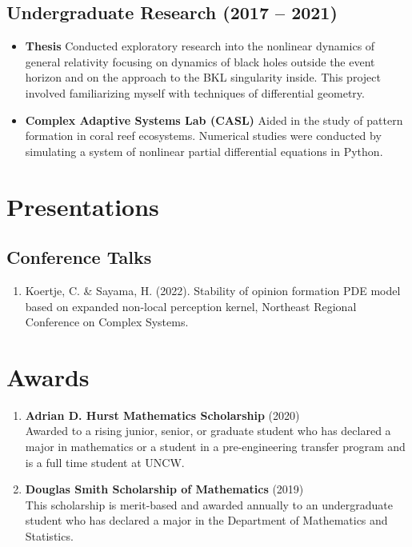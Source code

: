 \documentclass[12pt]{article}
\begin{document}
\subsection{\textbf{Undergraduate Research} \hfill (2017 -- 2021)}
\begin{itemize}
    \itemsep = 0em
    \item \textbf{Thesis} Conducted exploratory research into the nonlinear dynamics of general relativity focusing on dynamics of black holes outside the event horizon and on the approach to the BKL singularity inside. This project involved familiarizing myself with techniques of differential geometry.
    \item \textbf{Complex Adaptive Systems Lab (CASL)} Aided in the study of pattern formation in coral reef ecosystems. Numerical studies were conducted by simulating a system of nonlinear partial differential equations in Python.
\end{itemize}

\section{Presentations}
\subsection{Conference Talks}
\begin{enumerate}
    \itemsep = 0em
    \item Koertje, C. \& Sayama, H. (2022). Stability of opinion formation PDE model based on expanded non-local perception kernel, Northeast Regional Conference on Complex Systems.
\end{enumerate}


\section{Awards}
\begin{enumerate}
    \itemsep = 0em
    \item \textbf{Adrian D. Hurst Mathematics Scholarship} \hfill (2020) \\
    Awarded to a rising junior, senior, or graduate student who has declared a major in mathematics or a student in a pre-engineering transfer program and is a full time student at UNCW.
    \item \textbf{Douglas Smith Scholarship of Mathematics} \hfill (2019) \\
    This scholarship is merit-based and awarded annually to an undergraduate student who has declared a major in the Department of Mathematics and Statistics.
\end{enumerate}
\end{document}
